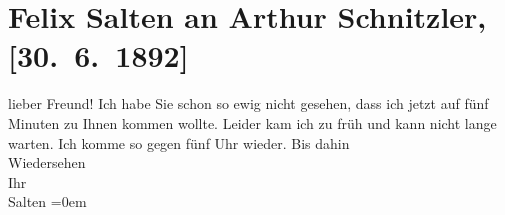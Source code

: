 

         
         \renewcommand{\erwaehntePersonen}{Personen: Felix Salten}
         \renewcommand{\erwaehnteOrte}{Orte: Wien}
         \renewcommand{\erwaehnteWerke}{}
               \section[Felix Salten an Arthur Schnitzler, {[}30. 6. 1892{]}]{ Felix Salten an Arthur Schnitzler, {[}30. 6. 1892{]}}\nopagebreak{}\rehead{ }\begin{ledgroupsized}[t]{13cm}\normalsize\beginnumbering{} \toendnotes[C]{\smallbreak\pagebreak[2]} 
\pstart{}{\pb}lieber Freund!\pend\pstart
           Ich habe Sie schon so ewig
               nicht gesehen, dass ich jetzt auf fünf Minuten zu Ihnen kommen wollte. Leider kam ich
               zu früh und kann nicht lange warten. {\pb}Ich komme so gegen fünf
                  Uhr wieder.\pend
           \pstart
           Bis dahin {\\[\baselineskip]}Wiedersehen {\\[\baselineskip]}Ihr {\\[\baselineskip]}\spacefill\mbox{Salten}\pend
           \leftskip=0em{}
         
         \endnumbering{}\end{ledgroupsized}  \newcommand{\dateiname}{L03185}\newcommand{\titel}{Felix Salten an Arthur Schnitzler, [30. 6. 1892]}\newcommand{\editorInnen}{Martin Anton Müller und Laura Untner}
      